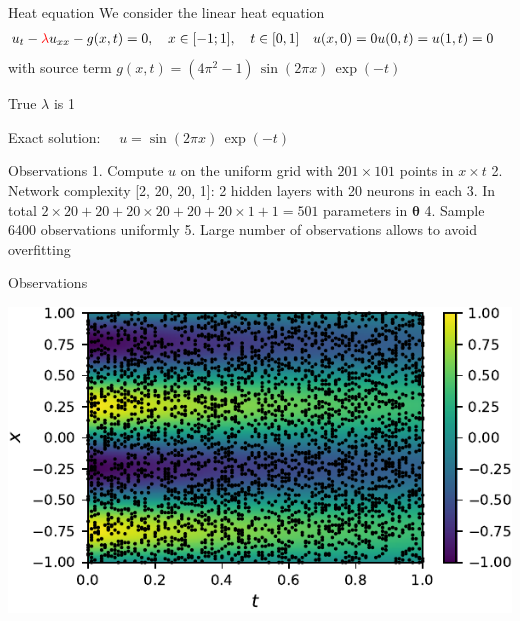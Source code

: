 \documentclass{beamer}
\def\\{}%
\renewcommand{\vec}[1]{\boldsymbol{#1}}
\newcommand{\VTheta}{\ensuremath{\vec{\theta}}}
\begin{document}
\begin{frame}{Heat equation}
We consider the linear heat equation
\begin{align*}
    &u_t - {\color{red}\lambda} u_{xx} - g(x, t) = 0, \quad x\in[-1; 1], \quad t\in[0, 1] \\
    &u(x, 0) = 0 \\
    &u(0, t) = u(1, t) = 0
\end{align*}
with source term $g(x, t) = (4\pi^2 -1) \, \sin(2\pi x) \, \exp(-t)$

\vspace{0.5cm}
True $\lambda$ is 1

Exact solution: $\quad u = \sin(2\pi x) \, \exp(-t)$
\end{frame}

\begin{frame}{Observations}
1. Compute $u$ on the uniform grid with $201\times101$ points in $x\times t$\\
2. Network complexity [2, 20, 20, 1]: 2 hidden layers with 20 neurons in each\\
3. In total $2\times20 + 20 + 20\times20 + 20 + 20\times1+1=501$ parameters in $\VTheta$\\
4. Sample 6400 observations uniformly\\
5. Large number of observations allows to avoid overfitting
\end{frame}

\begin{frame}{Observations}

\centering
\includegraphics{images/heateq-observations}
\end{frame}
\end{document}
